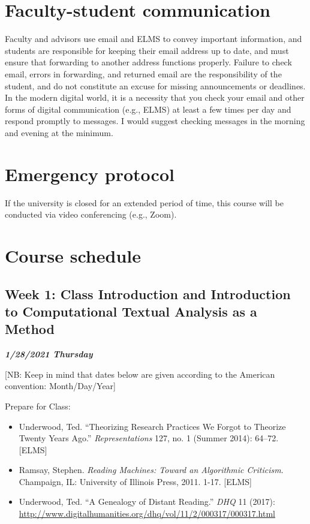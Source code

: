 \documentclass[
]{book}
\providecommand{\tightlist}{%
  \setlength{\itemsep}{0pt}\setlength{\parskip}{0pt}}
\begin{document}
\hypertarget{faculty-student-communication}{%
\section{Faculty-student communication}\label{faculty-student-communication}}

Faculty and advisors use email and ELMS to convey important information, and students are responsible for keeping their email address up to date, and must ensure that forwarding to another address functions properly. Failure to check email, errors in forwarding, and returned email are the responsibility of the student, and do not constitute an excuse for missing announcements or deadlines. In the modern digital world, it is a necessity that you check your email and other forms of digital communication (e.g., ELMS) at least a few times per day and respond promptly to messages. I would suggest checking messages in the morning and evening at the minimum.

\hypertarget{emergency-protocol}{%
\section{Emergency protocol}\label{emergency-protocol}}

If the university is closed for an extended period of time, this course will be conducted via video conferencing (e.g., Zoom).

\hypertarget{course-schedule}{%
\section{Course schedule}\label{course-schedule}}

\hypertarget{week-1-class-introduction-and-introduction-to-computational-textual-analysis-as-a-method}{%
\subsection{Week 1: Class Introduction and Introduction to Computational Textual Analysis as a Method}\label{week-1-class-introduction-and-introduction-to-computational-textual-analysis-as-a-method}}

\textbf{\emph{1/28/2021 Thursday}}

{[}NB: Keep in mind that dates below are given according to the American convention: Month/Day/Year{]}

Prepare for Class:

\begin{itemize}
\tightlist
\item
  Underwood, Ted. ``Theorizing Research Practices We Forgot to Theorize Twenty Years Ago.'' \emph{Representations} 127, no. 1 (Summer 2014): 64--72. {[}ELMS{]}
\item
  Ramsay, Stephen. \emph{Reading Machines: Toward an Algorithmic Criticism}. Champaign, IL: University of Illinois Press, 2011. 1-17. {[}ELMS{]}
\item
  Underwood, Ted. ``A Genealogy of Distant Reading.'' \emph{DHQ} 11 (2017): \url{http://www.digitalhumanities.org/dhq/vol/11/2/000317/000317.html}
\end{itemize}
\end{document}
